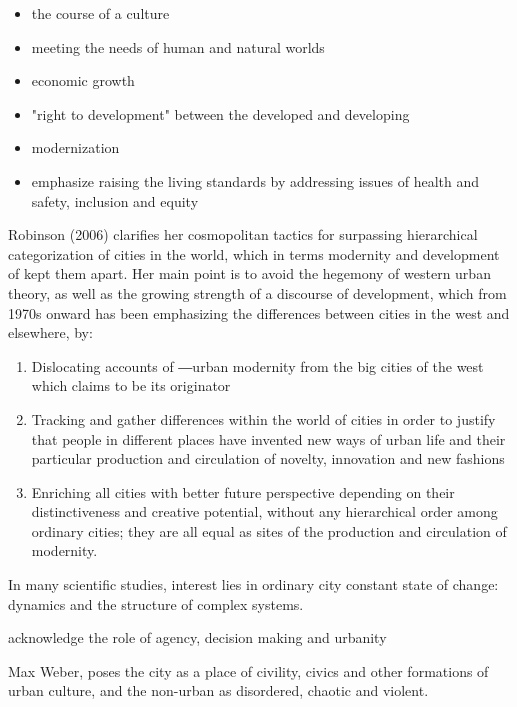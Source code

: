 \documentclass[11pt]{report}
\begin{document}
\begin{itemize}
\item the course of a culture
\item meeting the needs of human and natural worlds
\item economic growth
\item "right to development" between the developed and developing
\item modernization
\item emphasize raising the living standards by addressing issues of health and safety, inclusion and equity
\end{itemize}  
Robinson (2006) clarifies   her  cosmopolitan  tactics  for  surpassing  hierarchical categorization of cities in the world, which in terms modernity and development of kept them apart. Her main point is to avoid the hegemony of western urban theory, as  well as the growing  strength of a discourse of development, which from 1970s onward has been emphasizing the differences between cities in the west and elsewhere, by: 
\begin{enumerate}

\subsubsection{An Urban Development Process in an Ordinary City}

\item Dislocating accounts of ―urban modernity from the big cities of the west which claims to be its 
originator
\item Tracking  and  gather  differences  within  the  world  of  cities  in  order  to  justify  that  people  in different  places  have  invented  new  ways  of  urban  life  and  their  particular  production  and circulation of novelty, innovation and new fashions
\item Enriching  all  cities  with  better  future  perspective  depending  on  their  distinctiveness  and creative potential, without any hierarchical order among ordinary cities; they are all equal as 
sites of the production and circulation of modernity.
\end{enumerate}
In many scientific studies, interest lies in ordinary city constant state of change: dynamics and the structure of complex systems.

acknowledge the role of agency, decision making and urbanity

Max Weber, poses the city as a place of civility, civics and other formations of urban culture, and  the  non-urban  as  disordered,  chaotic  and violent.
\end{document}
